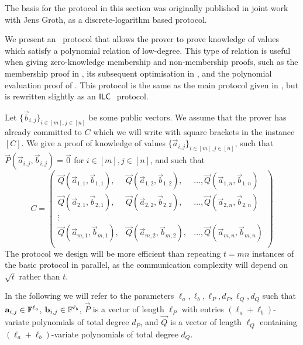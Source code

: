 The basis for the protocol in this section was originally published in joint work \cite{BootleG18} with Jens Groth, as a discrete-logarithm based protocol.

We present an \ILC\ protocol that allows the prover to prove knowledge of values which satisfy a polynomial relation of low-degree. This type of relation is useful when giving zero-knowledge membership and non-membership proofs, such as the membership proof in \cite{GrothK15}, its subsequent optimisation in \cite{BootleCCGGP15}, and the polynomial evaluation proof of \cite{BayerG13}. This protocol is the same as the main protocol given in \cite{BootleG18}, but is rewritten slightly as an $\mathsf{ILC}~$ protocol.

Let $\lbrace \vec{b}_{i,j} \rbrace_{i\in[m],j\in[n]}$ be some public vectors. We assume that the prover has already committed to $C$ which we will write with square brackets in the instance $[C]$. We give a proof of knowledge of values $\lbrace \vec{a}_{i,j} \rbrace_{i\in[m],j\in[n]}$, such that $\vec{P}(\vec{a}_{i,j},\vec{b}_{i,j})=\vec{0}$ for $i \in [m], j \in [n]$, and such that
$$C = \left(\begin{array}{lll}
\vec{Q}(\vec{a}_{1,1},\vec{b}_{1,1}),&\vec{Q}(\vec{a}_{1,2},\vec{b}_{1,2}),& \ldots,\vec{Q}(\vec{a}_{1,n},\vec{b}_{1,n}) \\
\vec{Q}(\vec{a}_{2,1},\vec{b}_{2,1}),&\vec{Q}(\vec{a}_{2,2},\vec{b}_{2,2}),& \ldots,\vec{Q}(\vec{a}_{2,n},\vec{b}_{2,n}) \\
\vdots \\
\vec{Q}(\vec{a}_{m,1},\vec{b}_{m,1}),&\vec{Q}(\vec{a}_{m,2},\vec{b}_{m,2}),& \ldots,\vec{Q}(\vec{a}_{m,n},\vec{b}_{m,n}) \\
\end{array}\right)$$
The protocol we design will be more efficient than repeating $t=mn$ instances of the basic protocol in parallel, as the communication complexity will depend on $\sqrt{t}$ rather than $t$.

In the following we will refer to the parameters $\ell_a,\ell_b,\ell_P,d_P,\ell_Q,d_Q$ such that $\mathbf{a}_{i,j}\in \mathbb{F}^{\ell_a}$, $\mathbf{b}_{i,j}\in \mathbb{F}^{\ell_b}$, $\vec{P}$ is a vector of length $\ell_P$ with entries $(\ell_a+\ell_b)$-variate polynomials of total degree $d_P$, and $\vec{Q}$ is a vector of length $\ell_Q$ containing $(\ell_a+\ell_b)$-variate polynomials of total degree $d_Q$.

